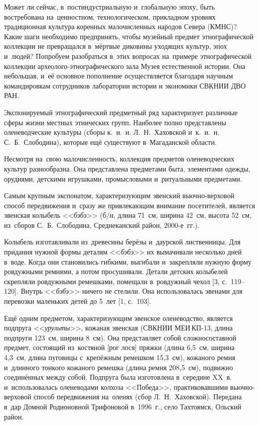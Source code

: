  

\makeProcTitle
{}

Может ли сейчас, в~постиндустриальную и~глобальную эпоху, быть востребована на~ценностном, технологическом, прикладном уровнях традиционная культура коренных малочисленных народов Севера (КМНС)? Какие шаги необходимо предпринять, чтобы музейный предмет этнографической коллекции не превращался в~мёртвые диковины уходящих культур, эпох и~людей? Попробуем разобраться в~этих вопросах на~примере этнографической коллекции археолого-этнографического зала Музея естественной истории. Она небольшая, и~её основное пополнение осуществляется благодаря научным командировкам сотрудников лаборатории истории и экономики СВКНИИ ДВО РАН.

Экспонируемый этнографический предметный ряд характеризует различные сферы жизни местных этнических групп. Наиболее полно представлены оленеводческие культуры (сборы к.~и.~н. Л.~Н.~Хаховской и~к.~и.~н. С.~Б.~Слободина), которые ещё существуют в~Магаданской области.

Несмотря на~свою малочисленность, коллекция предметов оленеводческих культур разнообразна. Она представлена предметами быта, элементами одежды, орудиями, детскими игрушками, промысловыми и~ритуальными предметами.

Самым крупным экспонатом, характеризующим эвенский вьючно-вер\-хо\-вой способ передвижения и~сразу же привлекающим внимание посетителей, является эвенская колыбель <<\textit{бэбэ}>> (б/н, длина 71~см, ширина 42~см, высота 52~см, из~сборов С.~Б.~Слободина, Среднеканский район, 2000-е~гг.).

Колыбель изготавливали из~древесины берёзы и~даурской лиственницы. Для придания нужной формы деталям <<\textit{бэбэ}>> их вымачивали несколько дней в~воде. Когда они становились гибкими, выгибали и~закрепляли нужную форму ровдужными ремнями, а потом просушивали. Детали детских колыбелей скрепляли ровдужными ремешками, помещали в~ровдужный чехол [3, с.~119--120]. Внутрь <<\textit{бэбэ}>> ничего не стелили. Она использовалась эвенами для перевозки маленьких детей до 5~лет [1, с.~103].

Ещё одним предметом, характеризующим эвенское оленеводство, является подпруга <<\textit{урульты}>>, кожаная эвенская (СВКНИИ МЕИ\,КП-13, длина подпруги 123~см, ширина 8~см). Она представляет собой сложносоставной предмет, состоящий из~костяной [рог лося] пряжки (длина 6,5~см, ширина 4,3~см, длина пуговицы с~крепёжным ремешком 15,3~см), кожаного ремня и~длинного тонкого кожаного ремешка (длина ремня 208,5~см), подвижно соединённых между собой. Подпруга была изготовлена в~середине XX~в. и~использовалась оленеводами колхоза <<Победа>>, практиковавшими вьючно-верховой способ передвижения на~оленях (сбор Л.~Н.~Хаховской). Передана в~дар Домной Родионовной Трифоновой в~1996~г., село Тахтоямск, Ольский район.


